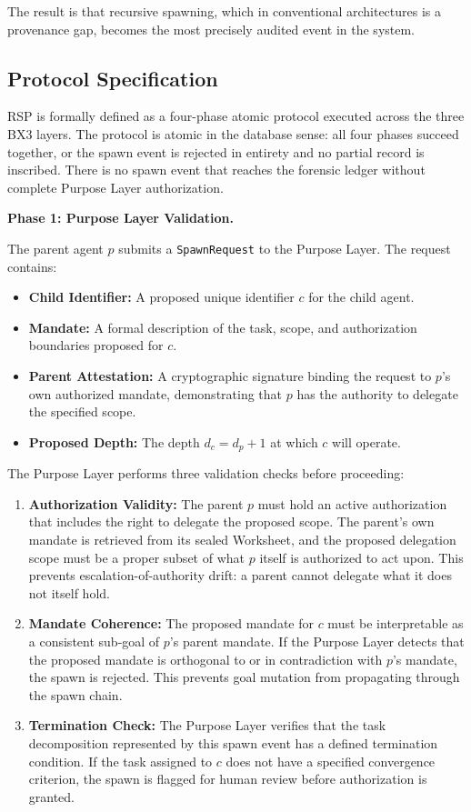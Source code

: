 The result is that recursive spawning, which in conventional architectures is a provenance gap, becomes the most precisely audited event in the system.

\subsection{Protocol Specification}

RSP is formally defined as a four-phase atomic protocol executed across the three BX3 layers. The protocol is atomic in the database sense: all four phases succeed together, or the spawn event is rejected in entirety and no partial record is inscribed. There is no spawn event that reaches the forensic ledger without complete Purpose Layer authorization.

\bigskip
\noindent\textbf{Phase 1: Purpose Layer Validation.}

The parent agent $p$ submits a \texttt{SpawnRequest} to the Purpose Layer. The request contains:

\begin{itemize}
    \item \textbf{Child Identifier:} A proposed unique identifier $c$ for the child agent.
    \item \textbf{Mandate:} A formal description of the task, scope, and authorization boundaries proposed for $c$.
    \item \textbf{Parent Attestation:} A cryptographic signature binding the request to $p$'s own authorized mandate, demonstrating that $p$ has the authority to delegate the specified scope.
    \item \textbf{Proposed Depth:} The depth $d_c = d_p + 1$ at which $c$ will operate.
\end{itemize}

The Purpose Layer performs three validation checks before proceeding:

\begin{enumerate}
    \item \textbf{Authorization Validity:} The parent $p$ must hold an active authorization that includes the right to delegate the proposed scope. The parent's own mandate is retrieved from its sealed Worksheet, and the proposed delegation scope must be a proper subset of what $p$ itself is authorized to act upon. This prevents escalation-of-authority drift: a parent cannot delegate what it does not itself hold.
    \item \textbf{Mandate Coherence:} The proposed mandate for $c$ must be interpretable as a consistent sub-goal of $p$'s parent mandate. If the Purpose Layer detects that the proposed mandate is orthogonal to or in contradiction with $p$'s mandate, the spawn is rejected. This prevents goal mutation from propagating through the spawn chain.
    \item \textbf{Termination Check:} The Purpose Layer verifies that the task decomposition represented by this spawn event has a defined termination condition. If the task assigned to $c$ does not have a specified convergence criterion, the spawn is flagged for human review before authorization is granted.
\end{enumerate}

